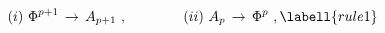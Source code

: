 \begin{equation}
(i)\ \Phi^{p+1}\,\rightarrow\, A_{p+1}\ ,
\qquad\qquad
(ii)\ A_p\,\rightarrow\,\Phi^p\ ,
\labell{rule1}
\end{equation}

